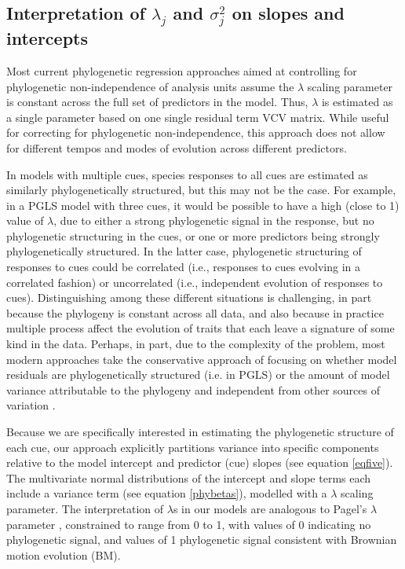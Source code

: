 \documentclass[11pt]{article}
\begin{document}
  
\subsection{Interpretation of $\lambda_j$ and $\sigma_j^2$ on slopes and intercepts}

Most current phylogenetic regression approaches aimed at controlling for phylogenetic non-independence of analysis units \citep[i.e. usually species, see][]{revell2010phylogenetic} assume the $\lambda$ scaling parameter is constant across the full set of predictors in the model. Thus, $\lambda$ is estimated as a single parameter based on one single residual term VCV matrix. While useful for correcting for phylogenetic non-independence, this approach does not allow for different tempos and modes of evolution across different predictors. 

In models with multiple cues, species responses to all cues are estimated as similarly phylogenetically structured, but this may not be the case. For example, in a PGLS model with three cues, it would be possible to have a high (close to 1) value of $\lambda$, due to either a strong phylogenetic signal in the response, but no phylogenetic structuring in the cues, or one or more predictors being strongly phylogenetically structured. In the latter case, phylogenetic structuring of responses to cues could be correlated (i.e., responses to cues evolving in a correlated fashion) or uncorrelated (i.e., independent evolution of responses to cues). Distinguishing among these different situations is challenging, in part because the phylogeny is constant across all data, and also because in practice multiple process affect the evolution of traits that each leave a signature of some kind in the data. Perhaps, in part, due to the complexity of the problem, most modern approaches take the conservative approach of focusing on whether model residuals are phylogenetically structured (i.e. in PGLS) or the amount of model variance attributable to the phylogeny and independent from other sources of variation \citep[i.e., in PMM, see][]{housworth2004phylogenetic}.

Because we are specifically interested in estimating the phylogenetic structure of each cue, our approach explicitly partitions variance into specific components relative to the model intercept and predictor (cue) slopes (see equation \ref{eqfive}). The multivariate normal distributions of the intercept and slope terms each include a variance term (see equation \ref{phybetas}), modelled with a $\lambda$ scaling parameter. The interpretation of $\lambda$s in our models are analogous to Pagel's $\lambda$  \citep{pagel1999inferring} parameter \citep{housworth2004phylogenetic}, constrained to range from 0 to 1, with values of 0 indicating no phylogenetic signal, and values of 1 phylogenetic signal consistent with Brownian motion evolution (BM). 
\end{document}

